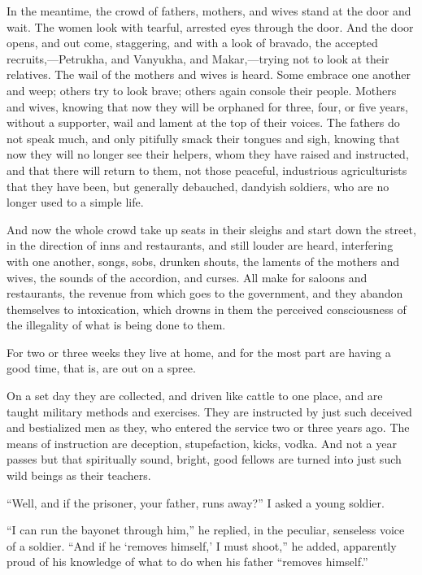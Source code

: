 \documentclass{book}
\begin{document}
In the meantime, the crowd of fathers, mothers, and wives stand at the door and wait. The women look with tearful, arrested eyes through the door. And the door opens, and out come, staggering, and with a look of bravado, the accepted recruits,—Petrukha, and Vanyukha, and Makar,—trying not to look at their relatives. The wail of the mothers and wives is heard. Some embrace one another and weep; others try to look brave; others again console their people. Mothers and wives, knowing that now they will be orphaned for three, four, or five years, without a supporter, wail and lament at the top of their voices. The fathers do not speak much, and only pitifully smack their tongues and sigh, knowing that now they will no longer see their helpers, whom they have raised and instructed, and that there will return to them, not those peaceful, industrious agriculturists that they have been, but generally debauched, dandyish soldiers, who are no longer used to a simple life.

And now the whole crowd take up seats in their sleighs and start down the street, in the direction of inns and restaurants, and still louder are heard, interfering with one another, songs, sobs, drunken shouts, the laments of the mothers and wives, the sounds of the accordion, and curses. All make for saloons and restaurants, the revenue from which goes to the government, and they abandon themselves to intoxication, which drowns in them the perceived consciousness of the illegality of what is being done to them.

For two or three weeks they live at home, and for the most part are having a good time, that is, are out on a spree.

On a set day they are collected, and driven like cattle to one place, and are taught military methods and exercises. They are instructed by just such deceived and bestialized men as they, who entered the service two or three years ago. The means of instruction are deception, stupefaction, kicks, vodka. And not a year passes but that spiritually sound, bright, good fellows are turned into just such wild beings as their teachers.

“Well, and if the prisoner, your father, runs away?” I asked a young soldier.

“I can run the bayonet through him,” he replied, in the peculiar, senseless voice of a soldier. “And if he ‘removes himself,’ I must shoot,” he added, apparently proud of his knowledge of what to do when his father “removes himself.”
\end{document}
